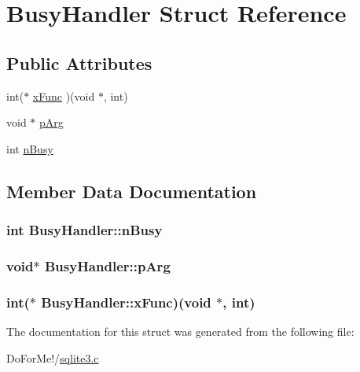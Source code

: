 \hypertarget{struct_busy_handler}{\section{Busy\-Handler Struct Reference}
\label{struct_busy_handler}
}
\subsection*{Public Attributes}
\begin{DoxyCompactItemize}
\item 
int($\ast$ \hyperlink{struct_busy_handler_aafc84c4e4934de2d5bdf02f268e9340f}{x\-Func} )(void $\ast$, int)
\item 
void $\ast$ \hyperlink{struct_busy_handler_a1c793d2b815e79cf3684de46847551bd}{p\-Arg}
\item 
int \hyperlink{struct_busy_handler_aac4531c677ed5ae9e4757ca1b02c568b}{n\-Busy}
\end{DoxyCompactItemize}


\subsection{Member Data Documentation}
\hypertarget{struct_busy_handler_aac4531c677ed5ae9e4757ca1b02c568b}{
\subsubsection[{n\-Busy}]{\setlength{\rightskip}{0pt plus 5cm}int Busy\-Handler\-::n\-Busy}}\label{struct_busy_handler_aac4531c677ed5ae9e4757ca1b02c568b}
\hypertarget{struct_busy_handler_a1c793d2b815e79cf3684de46847551bd}{
\subsubsection[{p\-Arg}]{\setlength{\rightskip}{0pt plus 5cm}void$\ast$ Busy\-Handler\-::p\-Arg}}\label{struct_busy_handler_a1c793d2b815e79cf3684de46847551bd}
\hypertarget{struct_busy_handler_aafc84c4e4934de2d5bdf02f268e9340f}{
\subsubsection[{x\-Func}]{\setlength{\rightskip}{0pt plus 5cm}int($\ast$ Busy\-Handler\-::x\-Func)(void $\ast$, int)}}\label{struct_busy_handler_aafc84c4e4934de2d5bdf02f268e9340f}


The documentation for this struct was generated from the following file\-:\begin{DoxyCompactItemize}
\item 
Do\-For\-Me!/\hyperlink{sqlite3_8c}{sqlite3.\-c}\end{DoxyCompactItemize}

